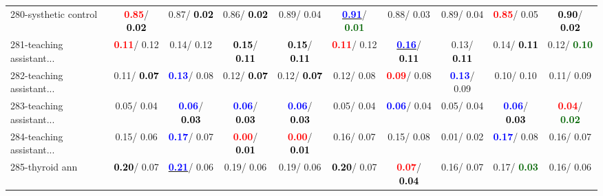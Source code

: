 \begin{table}[h]
\begin{center}
{\begin{tabular}{lc|c|c|c|c|c|c|c|c}
280-systhetic control & \textcolor{red}{\textbf{  0.85}}/\textcolor{black}{\textbf{  0.02}} &   0.87/\textcolor{black}{\textbf{  0.02}} &   0.86/\textcolor{black}{\textbf{  0.02}} &   0.89/  0.04 & \underline{\textcolor{blue}{\textbf{  0.91}}}/\textcolor{darkgreen}{\textbf{  0.01}} &   0.88/  0.03 &   0.89/  0.04 & \textcolor{red}{\textbf{  0.85}}/  0.05 & \textcolor{black}{\textbf{  0.90}}/\textcolor{black}{\textbf{  0.02}} \\
281-teaching assistant... & \textcolor{red}{\textbf{  0.11}}/  0.12 &   0.14/  0.12 & \textcolor{black}{\textbf{  0.15}}/\textcolor{black}{\textbf{  0.11}} & \textcolor{black}{\textbf{  0.15}}/\textcolor{black}{\textbf{  0.11}} & \textcolor{red}{\textbf{  0.11}}/  0.12 & \underline{\textcolor{blue}{\textbf{  0.16}}}/\textcolor{black}{\textbf{  0.11}} &   0.13/\textcolor{black}{\textbf{  0.11}} &   0.14/\textcolor{black}{\textbf{  0.11}} &   0.12/\textcolor{darkgreen}{\textbf{  0.10}} \\
282-teaching assistant... &   0.11/\textcolor{black}{\textbf{  0.07}} & \textcolor{blue}{\textbf{  0.13}}/  0.08 &   0.12/\textcolor{black}{\textbf{  0.07}} &   0.12/\textcolor{black}{\textbf{  0.07}} &   0.12/  0.08 & \textcolor{red}{\textbf{  0.09}}/  0.08 & \textcolor{blue}{\textbf{  0.13}}/  0.09 &   0.10/  0.10 &   0.11/  0.09 \\
283-teaching assistant... &   0.05/  0.04 & \textcolor{blue}{\textbf{  0.06}}/\textcolor{black}{\textbf{  0.03}} & \textcolor{blue}{\textbf{  0.06}}/\textcolor{black}{\textbf{  0.03}} & \textcolor{blue}{\textbf{  0.06}}/\textcolor{black}{\textbf{  0.03}} &   0.05/  0.04 & \textcolor{blue}{\textbf{  0.06}}/  0.04 &   0.05/  0.04 & \textcolor{blue}{\textbf{  0.06}}/\textcolor{black}{\textbf{  0.03}} & \textcolor{red}{\textbf{  0.04}}/\textcolor{darkgreen}{\textbf{  0.02}} \\
284-teaching assistant... &   0.15/  0.06 & \textcolor{blue}{\textbf{  0.17}}/  0.07 & \textcolor{red}{\textbf{  0.00}}/\textcolor{black}{\textbf{  0.01}} & \textcolor{red}{\textbf{  0.00}}/\textcolor{black}{\textbf{  0.01}} &   0.16/  0.07 &   0.15/  0.08 &   0.01/  0.02 & \textcolor{blue}{\textbf{  0.17}}/  0.08 &   0.16/  0.07 \\ \hline
285-thyroid ann & \textcolor{black}{\textbf{  0.20}}/  0.07 & \underline{\textcolor{blue}{\textbf{  0.21}}}/  0.06 &   0.19/  0.06 &   0.19/  0.06 & \textcolor{black}{\textbf{  0.20}}/  0.07 & \textcolor{red}{\textbf{  0.07}}/\textcolor{black}{\textbf{  0.04}} &   0.16/  0.07 &   0.17/\textcolor{darkgreen}{\textbf{  0.03}} &   0.16/  0.06 \\

\end{tabular}}
\end{center}
\end{table}
